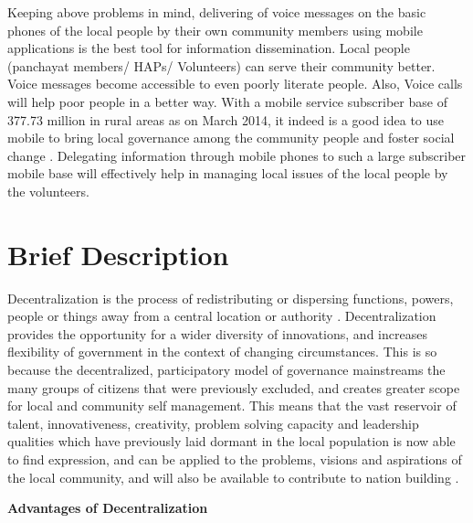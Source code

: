 Keeping above problems in mind, delivering of voice messages on the basic phones of the local people by their own community members using mobile applications is the best tool for information dissemination. Local people (panchayat members/ HAPs/ Volunteers) can serve their community better.  Voice messages become accessible to even poorly literate people. Also, Voice calls will help poor people in a better way. With a mobile service subscriber base of  377.73 million in rural areas as on March 2014, it indeed is a good idea to use mobile to bring local governance among the community people and foster social change \cite{ruralpop:online}. Delegating information through mobile phones to such a  large subscriber mobile base will effectively help in managing local issues of the local people by the volunteers.

\section{Brief Description}
Decentralization is the process of redistributing or dispersing functions, powers, people or things away from a central location or authority \cite{bardhan2002decentralization}. Decentralization provides the opportunity for a wider diversity of innovations, and increases flexibility of government in the context of changing circumstances. This is so because the decentralized, participatory model of governance mainstreams the many groups of citizens that were previously excluded, and creates greater scope for local and community self management. This means that the vast reservoir of talent, innovativeness, creativity, problem solving capacity and leadership qualities which have previously laid dormant in the local population is now able to find expression, and can be applied to the problems, visions and aspirations of the local community, and will also be available to contribute to nation building \cite{Decentral:online}.

\textbf{Advantages of Decentralization}

